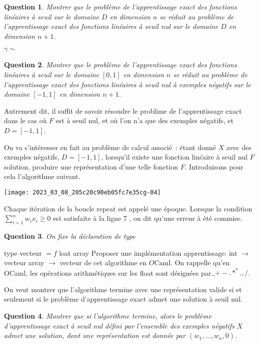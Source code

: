 \documentclass[10pt]{article}
\newtheorem{question}{Question}
\begin{document}
\begin{question}
	Montrer que le problème de l'apprentissage exact des fonctions linéaires à seuil sur le domaine $D$ en dimension $n$ se réduit au problème de l'apprentissage exact des fonctions linéaires à seuil nul sur le domaine $D$ en dimension $n+1$.
\end{question}

$\gamma \sim$ \begin{question}
	Montrer que le problème de l'apprentissage exact des fonctions linéaires à seuil sur le domaine $[0,1]$ en dimension $n$ se réduit au problème de l'apprentissage exact des fonctions linéaires à seuil nul à exemples négatifs sur le domaine $[-1,1]$ en dimension $n+1$.
\end{question}

Autrement dit, il suffit de savoir résoudre le problime de l'apprentissage exact dans le cas où $F$ est à seuil nul, et où l'on n'a que des exemples négatifs, et $D=[-1,1]$.

On va s'intéresser en fait au problème de calcul associé : étant donné $X$ avec des exemples négatifs, $D=[-1,1]$, lorsqu'il existe une fonction linćaire à seuil nul $F$ solution, produire une représentation d'une telle fonction $F$. Introduisons pour cela l'algorithme suivant.

\begin{center}
\texttt{[image: 2023\_03\_08\_205c20c90eb05fc7e35cg-04]}
\end{center}

Chaque itération de la boucle repeat est appelé une époque. Lorsque la condition $\sum_{i=1}^{n} w_{i} x_{i} ≥ 0$ est satisfaite à la ligne 7 , on dit qu'une erreur à été commise.

\begin{question}
	On fixe la déclaration de type
\end{question}

type vecteur $=f$ loat array Proposer une implémentation apprentissage: int $→$ vecteur array $→$ vecteur de cet algorithme en $O \mathrm{Caml}$. On rappelle qu'en OCaml, les opérations arithmétiques sur les float sont désignées par.,$+-. *^{*} ., /$.

On veut montrer que l'algorithme termine avec une représentation valide si et seulement si le problème d'apprentissage exact admet une solution à seuil nul.

\begin{question}
	Montrer que si l'algorithme termine, alors le problème d'apprentissage exact à seuil nul défini par l'ensemble des exemples négatifs $X$ admet une solution, dont une représentation est donnée par $\left(w_{1}, \ldots, w_{n}, 0\right)$.
\end{question}
\end{document}
